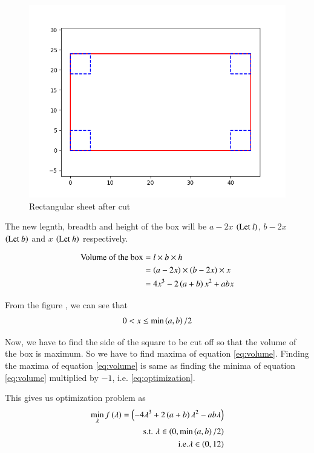 \documentclass[journal,12pt,twocolumn]{IEEEtran}
\begin{document}
\begin{figure}[!htb]
    \centering
    \includegraphics[width=\columnwidth]{figs/rectangle2.png}
    \caption{Rectangular sheet after cut}
    \label{fig:rectangular sheet cut}
\end{figure}

The new legnth, breadth and height of the box will be $a-2x$ $\left(\text{Let }l\right)$, $b-2x$ $\left(\text{Let }b\right)$ and $x$ $\left(\text{Let }h\right)$ respectively.

\begin{align}
    \text{Volume of the box} &= l \times b \times h \\
    & = (a-2x) \times (b-2x) \times x \\
    \label{eq:volume} & = 4x^3 - 2\left(a+b\right)x^2 + abx
\end{align}

From the figure , we can see that
\begin{align}
    \label{eq:x_range}
    0 < x \leq \min\left(a,b\right)/2
\end{align}

Now, we have to find the side of the square to be cut off so that the volume of the box is maximum. So we have to find maxima of equation \eqref{eq:volume}.
Finding the maxima of equation \eqref{eq:volume} is same as finding the minima of equation \eqref{eq:volume} multiplied by $-1$, i.e. \eqref{eq:optimization}.


This gives us optimization problem as
\begin{align}
    \label{eq:optimization}
    \min_{\lambda} f\left(\lambda\right) = \left(-4\lambda^3 + 2\left(a+b\right)\lambda^2 - ab\lambda\right)\\
    \text{s.t. } \lambda \in \left(0, \min\left(a,b\right)/2\right)\\
    \text{i.e.} \lambda \in \left(0, 12\right)
\end{align}
\end{document}
